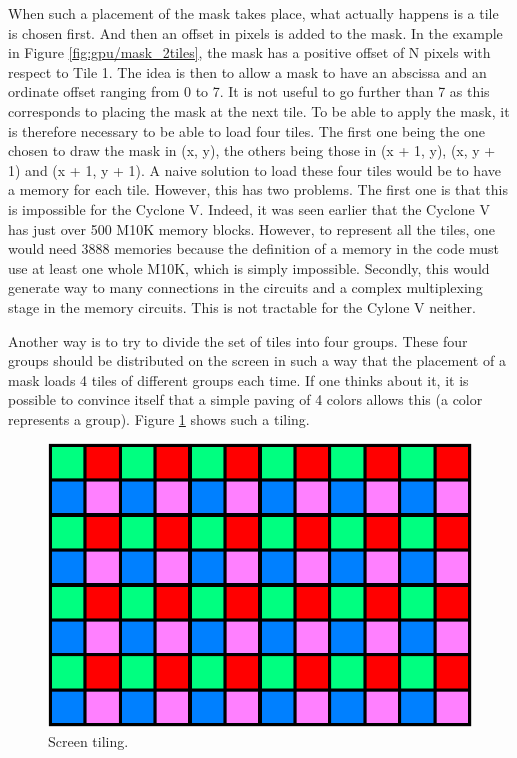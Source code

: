 When such a placement of the mask takes place, what actually happens is a tile is chosen first. And 
then an offset in pixels is added to the mask. In the example in Figure \ref{fig:gpu/mask_2tiles}, 
the mask has a positive 
offset of N pixels with respect to Tile 1. The idea is then to allow a mask to have an abscissa and
an ordinate offset ranging from 0 to 7. It is not useful to go further than 7 
as this corresponds to placing the mask at the next tile. To be able to apply the mask, it is 
therefore necessary to be able to load four tiles. The first one being the one chosen to draw the 
mask in (x, y), the others being those in (x + 1, y), (x, y + 1) and (x + 1, y + 1). A naive 
solution to load these four tiles would be to have a memory for each tile. However, this has two 
problems. The first one is that this is impossible for the Cyclone V. Indeed, it was seen earlier that 
the Cyclone V has just over 500 M10K memory blocks. However, to represent all the tiles, one would 
need 3888 memories because the definition of a memory in the code must use at least one whole M10K, 
which is simply impossible. Secondly, this would generate way to many connections in the circuits
and a complex multiplexing stage in the memory circuits. This is not tractable for the Cylone V 
neither.

Another way is to try to divide the set of tiles into four groups. These four groups should be 
distributed on the screen in such a way that the placement of a mask loads 4 tiles of different 
groups each time. If one thinks about it, it is possible to convince itself that a simple paving 
of 4 colors allows this (a color represents a group). Figure \ref{fig:gpu/screen_tiling} shows such 
a tiling. 

\begin{figure}[H]
    \centering
    \includegraphics[scale=1.0]{Chapter4-GPU_CLKU/res/screen_tiling}
    \caption{Screen tiling.}
    \label{fig:gpu/screen_tiling}
\end{figure}

